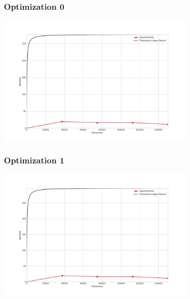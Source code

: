 \subsubsection{Optimization 0}
\begin{center}
    \resizebox{0.8\textwidth}{!}{}
    \includegraphics[width=0.74\textwidth]{../img/speedup-graph_type-random-150000-O0}
\end{center}


\subsubsection{Optimization 1}
\begin{center}
    \resizebox{0.8\textwidth}{!}{}
    \includegraphics[width=0.74\textwidth]{../img/speedup-graph_type-random-150000-O1}
\end{center}

\clearpage
